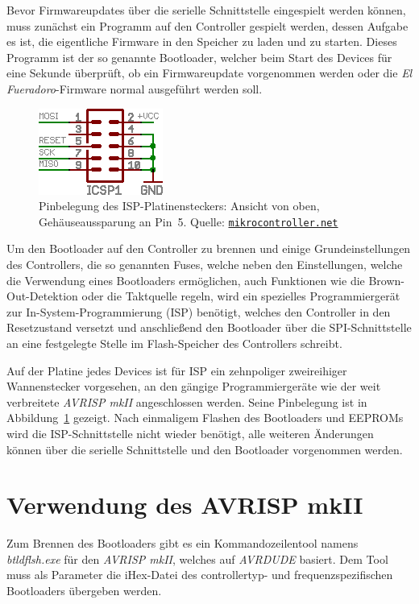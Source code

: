 \documentclass[paper=a4, parskip, numbers=noenddot, toc=listof, headsepline]{scrbook}
\newcommand{\anlage}{\emph{El Fueradoro}}
\begin{document}
		Bevor Firmwareupdates über die serielle Schnittstelle eingespielt werden können, muss zunächst ein Programm auf den Controller gespielt werden, dessen Aufgabe es ist, die eigentliche Firmware in den Speicher zu laden und zu starten. Dieses Programm ist der so genannte Bootloader, welcher beim Start des Devices für eine Sekunde überprüft, ob ein Firmwareupdate vorgenommen werden oder die {\anlage}-Firmware normal ausgeführt werden soll.

		\begin{figure}[!h]
			\centering
			\includegraphics[width=.35\textwidth]{Bilder/isp}
			\caption{Pinbelegung des ISP-Platinensteckers: Ansicht von oben, Gehäuseaussparung an Pin~5. Quelle: \href{http://www.mikrocontroller.net}{\texttt{mikrocontroller.net}}}
			\label{fig:isp}
		\end{figure}

		Um den Bootloader auf den Controller zu brennen und einige Grundeinstellungen des Controllers, die so genannten Fuses, welche neben den Einstellungen, welche die Verwendung eines Bootloaders ermöglichen, auch Funktionen wie die Brown-Out-Detektion oder die Taktquelle regeln, wird ein spezielles Programmiergerät zur In-System-Programmierung (ISP) benötigt, welches den Controller in den Resetzustand versetzt und anschließend den Bootloader über die SPI-Schnittstelle an eine festgelegte Stelle im Flash-Speicher des Controllers schreibt.

		Auf der Platine jedes Devices ist für ISP ein zehnpoliger zweireihiger Wannenstecker vorgesehen, an den gängige Programmiergeräte wie der weit verbreitete \emph{AVRISP mkII} angeschlossen werden. Seine Pinbelegung ist in Abbildung~\ref{fig:isp} gezeigt. Nach einmaligem Flashen des Bootloaders und EEPROMs wird die ISP-Schnittstelle nicht wieder benötigt, alle weiteren Änderungen können über die serielle Schnittstelle und den Bootloader vorgenommen werden.

		\section{Verwendung des AVRISP mkII}

			Zum Brennen des Bootloaders gibt es ein Kommandozeilentool namens \emph{btldflsh.exe} für den \emph{AVRISP mkII}, welches auf \emph{AVRDUDE} basiert. Dem Tool muss als Parameter die iHex-Datei des controllertyp- und frequenzspezifischen Bootloaders übergeben werden.
\end{document}
